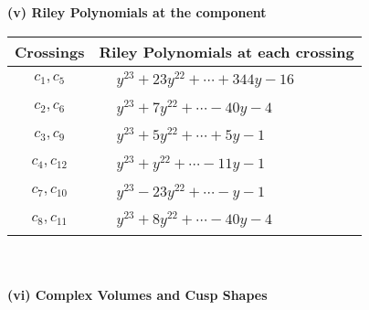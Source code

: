 \documentclass[1p]{elsarticle_modified}
\theoremstyle{definition}
\begin{document}
\newpage\renewcommand{\arraystretch}{1}
\flushleft \textbf{(v) Riley Polynomials at the component}\newline \\
\begin{tabular}{m{50pt}|m{274pt}}
Crossings & \hspace{64pt}Riley Polynomials at each crossing \\
\hline $$\begin{aligned}c_{1},c_{5}\end{aligned}$$&$\begin{aligned}
&y^{23}+23 y^{22}+\cdots+344 y-16
\end{aligned}$\\
\hline $$\begin{aligned}c_{2},c_{6}\end{aligned}$$&$\begin{aligned}
&y^{23}+7 y^{22}+\cdots-40 y-4
\end{aligned}$\\
\hline $$\begin{aligned}c_{3},c_{9}\end{aligned}$$&$\begin{aligned}
&y^{23}+5 y^{22}+\cdots+5 y-1
\end{aligned}$\\
\hline $$\begin{aligned}c_{4},c_{12}\end{aligned}$$&$\begin{aligned}
&y^{23}+y^{22}+\cdots-11 y-1
\end{aligned}$\\
\hline $$\begin{aligned}c_{7},c_{10}\end{aligned}$$&$\begin{aligned}
&y^{23}-23 y^{22}+\cdots- y-1
\end{aligned}$\\
\hline $$\begin{aligned}c_{8},c_{11}\end{aligned}$$&$\begin{aligned}
&y^{23}+8 y^{22}+\cdots-40 y-4
\end{aligned}$\\
\hline
\end{tabular}\\~\\
\newpage\flushleft \textbf{(vi) Complex Volumes and Cusp Shapes}
\end{document}
